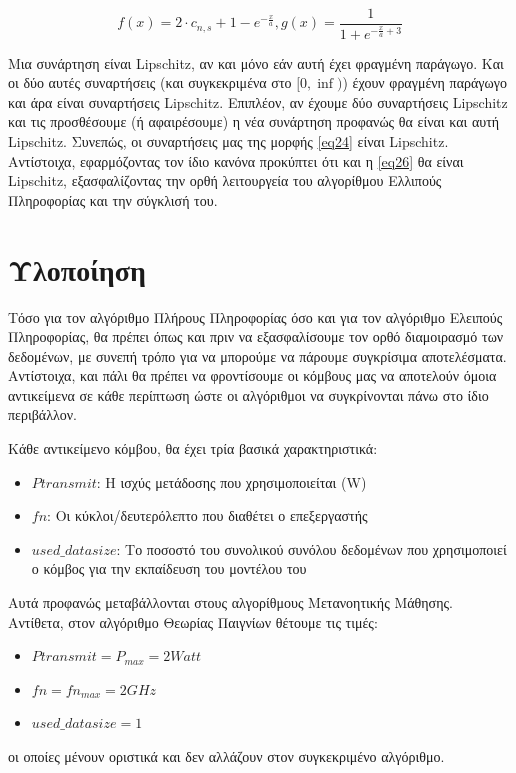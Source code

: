\[f(x) = 2 \cdot c_{n,s} + 1 - e^{-\frac{x}{a}}, g(x) = \frac{1}{1 + e^{-\frac{x}{a} + 3}}\]

Μια συνάρτηση είναι Lipschitz, αν και μόνο εάν αυτή έχει φραγμένη παράγωγο. Και οι δύο αυτές συναρτήσεις (και συγκεκριμένα στο $[0,\inf)$) έχουν φραγμένη παράγωγο και άρα είναι συναρτήσεις Lipschitz. Επιπλέον, αν έχουμε δύο συναρτήσεις Lipschitz και τις προσθέσουμε (ή αφαιρέσουμε) η νέα συνάρτηση προφανώς θα είναι και αυτή Lipschitz. Συνεπώς, οι συναρτήσεις μας της μορφής \ref{eq24} είναι Lipschitz. Αντίστοιχα, εφαρμόζοντας τον ίδιο κανόνα προκύπτει ότι και η \ref{eq26} θα είναι Lipschitz, εξασφαλίζοντας την ορθή λειτουργεία του αλγορίθμου Ελλιπούς Πληροφορίας και την σύγκλισή του.

\section{Υλοποίηση}

Τόσο για τον αλγόριθμο Πλήρους Πληροφορίας όσο και για τον αλγόριθμο Ελειπούς Πληροφορίας, θα πρέπει όπως και πριν να εξασφαλίσουμε τον ορθό διαμοιρασμό των δεδομένων, με συνεπή τρόπο για να μπορούμε να πάρουμε συγκρίσιμα αποτελέσματα. Αντίστοιχα, και πάλι θα πρέπει να φροντίσουμε οι κόμβους μας να αποτελούν όμοια αντικείμενα σε κάθε περίπτωση ώστε οι αλγόριθμοι να συγκρίνονται πάνω στο ίδιο περιβάλλον.

Κάθε αντικείμενο κόμβου, θα έχει τρία βασικά χαρακτηριστικά:
\begin{itemize}
    \item $Ptransmit$: Η ισχύς μετάδοσης που χρησιμοποιείται (W)
    \item $fn$: Οι κύκλοι/δευτερόλεπτο που διαθέτει ο επεξεργαστής
    \item $used\_datasize$: Το ποσοστό του συνολικού συνόλου δεδομένων που χρησιμοποιεί ο κόμβος για την εκπαίδευση του μοντέλου του   
\end{itemize}

Αυτά προφανώς μεταβάλλονται στους αλγορίθμους Μετανοητικής Μάθησης. Αντίθετα, στον αλγόριθμο Θεωρίας Παιγνίων θέτουμε τις τιμές:
\begin{itemize}
    \item $Ptransmit = P_{max} = 2 Watt$
    \item $fn = fn_{max} = 2 GHz$
    \item $used\_datasize = 1$   
\end{itemize}
οι οποίες μένουν οριστικά και δεν αλλάζουν στον συγκεκριμένο αλγόριθμο.

